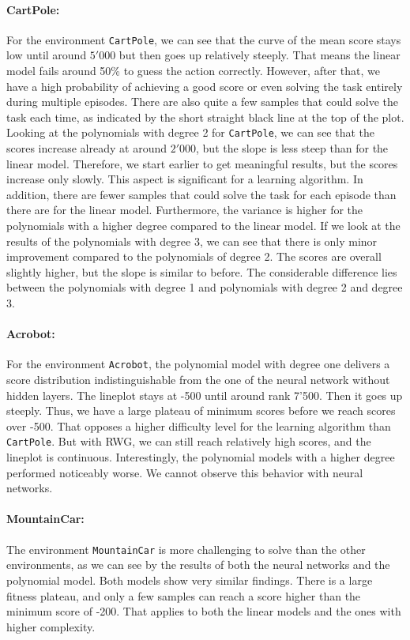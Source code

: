 \paragraph*{CartPole:} For the environment \verb|CartPole|, we can see that the curve of the mean score stays low until around $5'000$ but then goes up relatively steeply. That means the linear model fails around 50\% to guess the action correctly. However, after that, we have a high probability of achieving a good score or even solving the task entirely during multiple episodes. There are also quite a few samples that could solve the task each time, as indicated by the short straight black line at the top of the plot. Looking at the polynomials with degree 2 for \verb|CartPole|, we can see that the scores increase already at around $2'000$, but the slope is less steep than for the linear model. Therefore, we start earlier to get meaningful results, but the scores increase only slowly. This aspect is significant for a learning algorithm. In addition, there are fewer samples that could solve the task for each episode than there are for the linear model. Furthermore, the variance is higher for the polynomials with a higher degree compared to the linear model. If we look at the results of the polynomials with degree 3, we can see that there is only minor improvement compared to the polynomials of degree 2. The scores are overall slightly higher, but the slope is similar to before. The considerable difference lies between the polynomials with degree 1 and polynomials with degree 2 and degree 3.

\paragraph*{Acrobot:} For the environment \verb|Acrobot|, the polynomial model with degree one delivers a score distribution indistinguishable from the one of the neural network without hidden layers. The lineplot stays at -500 until around rank 7'500. Then it goes up steeply. Thus, we have a large plateau of minimum scores before we reach scores over -500. That opposes a higher difficulty level for the learning algorithm than \verb|CartPole|. But with RWG, we can still reach relatively high scores, and the lineplot is continuous. Interestingly, the polynomial models with a higher degree performed noticeably worse. We cannot observe this behavior with neural networks.

\paragraph*{MountainCar:} The environment \verb|MountainCar| is more challenging to solve than the other environments, as we can see by the results of both the neural networks and the polynomial model. Both models show very similar findings. There is a large fitness plateau, and only a few samples can reach a score higher than the minimum score of -200. That applies to both the linear models and the ones with higher complexity.

